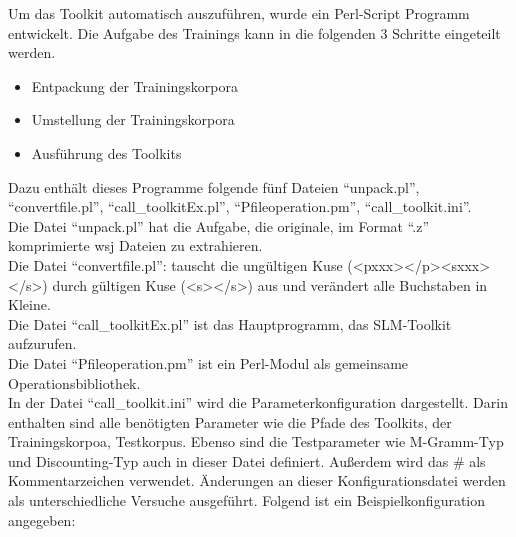 
Um das Toolkit automatisch auszuf\"uhren, wurde ein Perl-Script Programm entwickelt. Die Aufgabe des Trainings kann in die folgenden  3 Schritte eingeteilt werden.
\begin{itemize}
	\item Entpackung der Trainingskorpora
	\item Umstellung der Trainingskorpora
	\item Ausf\"uhrung des Toolkits
\end{itemize}
Dazu enth\"alt dieses Programme folgende f\"unf Dateien "`unpack.pl"', "`convertfile.pl"', "`call\_toolkitEx.pl"', "`Pfileoperation.pm"',  "`call\_toolkit.ini"'.\\
Die Datei "`unpack.pl"' hat die Aufgabe, die originale, im Format "`.z"' komprimierte  wsj Dateien zu extrahieren.\\
Die Datei "`convertfile.pl"': tauscht die ung\"ultigen Kuse (<pxxx></p><sxxx></s>) durch g\"ultigen Kuse (<s></s>) aus und ver\"andert alle Buchstaben in Kleine. \\
Die Datei "`call\_toolkitEx.pl"' ist das Hauptprogramm, das SLM-Toolkit aufzurufen.\\ 
Die Datei "`Pfileoperation.pm"' ist ein Perl-Modul\cite{book_perl} als gemeinsame Operationsbibliothek.\\
In der Datei "`call\_toolkit.ini"'  wird die Parameterkonfiguration dargestellt. Darin enthalten sind alle ben\"otigten Parameter wie die Pfade des Toolkits, der Trainingskorpoa, Testkorpus. Ebenso sind die Testparameter wie M-Gramm-Typ und Discounting-Typ auch in dieser Datei definiert. Au\ss erdem wird das \glqq \# \grqq  als Kommentarzeichen verwendet. \"Anderungen an dieser Konfigurationsdatei werden als unterschiedliche Versuche ausgef\"uhrt. Folgend ist ein Beispielkonfiguration angegeben:

